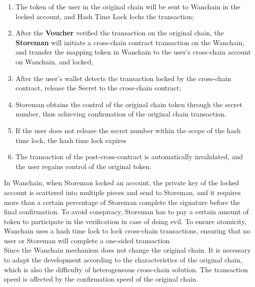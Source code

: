 \begin{enumerate}
    \item The token of the user in the original chain will be sent to Wanchain in the locked account, and Hash Time Lock locks the transaction;
    \item After the \textbf{Voucher} verified  the transaction on the original chain, the \textbf{Storeman} will initiate a cross-chain contract transaction on the Wanchain, and transfer the mapping token in Wanchain to the user's cross-chain account on Wanchain, and locked;
    \item After the user's wallet detects the transaction locked by the cross-chain contract, release the Secret to the cross-chain contract;
    \item Storeman obtains the control of the original chain token through the secret number, thus achieving confirmation of the original chain transaction.
    \item If the user does not release the secret number within the scope of the hash time lock, the hash time lock expires
    \item The transaction of the post-cross-contract is automatically invalidated, and the user regains control of the original token.
\end{enumerate}

\noindent In Wanchain, when Storeman locked an account, the private key of the locked account is scattered into multiple pieces and send to Storeman, and it requires more than a certain percentage of Storeman complete the signature before the final confirmation. To avoid conspiracy, Storeman has to pay a certain amount of token to participate in the verification in case of doing evil. To ensure atomicity, Wanchain uses a hash time lock to lock cross-chain transactions, ensuring that no user or Storeman will complete a one-sided transaction.\\

\noindent Since the Wanchain mechanism does not change the original chain. It is necessary to adapt the development according to the characteristics of the original chain, which is also the difficulty of heterogeneous cross-chain solution. The transaction speed is affected by the confirmation speed of the original chain.\\\\
